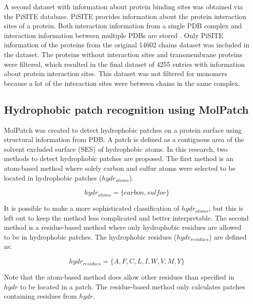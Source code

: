 \documentclass[11pt,a4paper]{article}
\begin{document}
A second dataset with information about protein binding sites was obtained via the PiSITE database. PiSITE provides information about the protein interaction sites of a protein. Both interaction information from a single PDB complex and interaction information between multiple PDBs are stored  \cite{higurashi2009pisite}. Only PiSITE information of the proteins from the original 14602 chains dataset was included in the dataset. The proteins without interaction sites and transmembrane proteins were filtered, which resulted in the final dataset of 4255 entries with information about protein interaction sites. This dataset was not filtered for monomers because a lot of the interaction sites were between chains in the same complex.

\subsection{Hydrophobic patch recognition using MolPatch}
MolPatch was created to detect hydrophobic patches on a protein surface using structural information from PDB. A patch is defined as a contiguous area of the solvent excluded surface (SES) of hydrophobic atoms. In this research, two methods to detect hydrophobic patches are proposed. The first method is an atom-based method where solely carbon and sulfur atoms were selected to be located in hydrophobic patches ($hydr_{atoms}$). 

\begin{equation}
hydr_{atoms} = \{carbon, sulfor\}
\end{equation}

It is possible to make a more sophisticated classification of $hydr_{atoms}$, but this is left out to keep the method less complicated and better interpretable. The second method is a residue-based method where only hydrophobic residues are allowed to be in hydrophobic patches. The hydrophobic residues ($hydr_{residues}$) are defined as:

\begin{equation}
hydr_{residues} = \{A, F, C, L, I, W, V, M, Y \}
\end{equation}

Note that the atom-based method does allow other residues than specified in $hydr$ to be located in a patch. The residue-based method only calculates patches containing residues from $hydr$.
\end{document}
